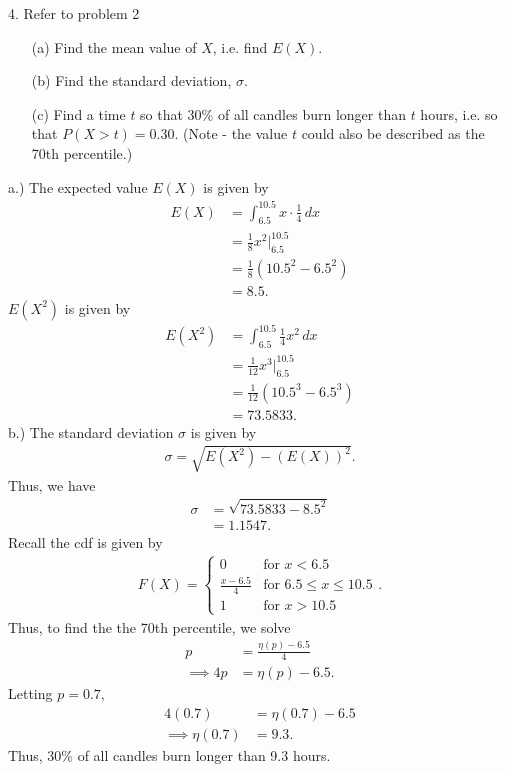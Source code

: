 \documentclass{report}
\begin{document}
 

 \pagebreak \bigbreak \noindent 
 \begin{mdframed}
     4. Refer to problem 2
     \begin{enumerate}
         \item[(a)] Find the mean value of $X$, i.e. find $E(X)$.
         \item[(b)] Find the standard deviation, $\sigma$.
         \item[(c)] Find a time $t$ so that 30\% of all candles burn longer than $t$ hours, i.e. so that $P(X > t) = 0.30$. (Note - the value $t$ could also be described as the 70th percentile.)
     \end{enumerate}
 \end{mdframed}
 \bigbreak \noindent 
 a.) The expected value $E(X)$ is given by
 \begin{align*}
     E(X) &= \int_{6.5}^{10.5}x \cdot \frac{1}{4} \, dx \\
     &=\frac{1}{8}x^{2} \bigg|^{10.5}_{6.5} \\
     &= \frac{1}{8}(10.5^{2} - 6.5^{2}) \\
     &=8.5
 .\end{align*}
 $E(X^{2})$ is given by
 \begin{align*}
     E(X^{2}) &= \int_{6.5}^{10.5}  \frac{1}{4}x^{2}\, dx \\
     &=\frac{1}{12}x^{3} \bigg|^{10.5}_{6.5} \\
     &= \frac{1}{12}(10.5^{3} - 6.5^{3}) \\
     &=73.5833
 .\end{align*}
 \bigbreak \noindent 
 b.) The standard deviation $\sigma$ is given by
 \begin{align*}
    \sigma = \sqrt{E(X^{2}) - \left(E(X)\right)^{2}}
 .\end{align*}
 \bigbreak \noindent 
 Thus, we have
 \begin{align*}
     \sigma &= \sqrt{73.5833 - 8.5^{2}}  \\
    &=1.1547
 .\end{align*}
 \bigbreak \noindent 
 Recall the cdf is given by
 \begin{align*}
     F(X) = 
     \begin{cases}
         0 & \text{for } x < 6.5 \\
         \frac{x-6.5}{4} & \text{for } 6.5 \leq x \leq 10.5 \\    
         1 & \text{for } x > 10.5
     \end{cases}
 .\end{align*}
 \bigbreak \noindent 
 Thus, to find the the 70th percentile, we solve
 \begin{align*}
     p &= \frac{\eta(p) - 6.5}{4} \\
     \implies 4p &= \eta(p) - 6.5
 .\end{align*}
 Letting $p=0.7$, 
 \begin{align*}
     4(0.7) &= \eta(0.7) - 6.5 \\
     \implies \eta(0.7) &= 9.3
 .\end{align*}
 \bigbreak \noindent 
 Thus, 30\% of all candles burn longer than 9.3 hours.
\end{document}
